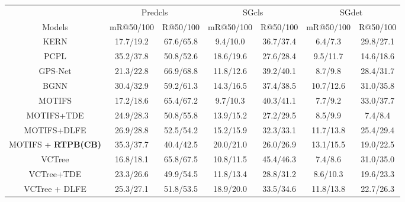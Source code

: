 \begin{table}[!ht]
	\centering
	\small
	\begin{tabular}{c|cc|cc|cc}
		\hline
		& \multicolumn{2}{c|}{Predcls} & \multicolumn{2}{c|}{SGcls} & \multicolumn{2}{c}{SGdet} \\
		Models                         & mR@50/100     & R@50/100     & mR@50/100    & R@50/100    & mR@50/100    & R@50/100    \\ \hline
		KERN\ddag\cite{chen2019knowledge}                      & 17.7/19.2     & 67.6/65.8    & 9.4/10.0     & 36.7/37.4   & 6.4/7.3      & 29.8/27.1   \\
		PCPL\ddag\cite{yan2020pcpl}                      & 35.2/37.8     & 50.8/52.6    & 18.6/19.6    & 27.6/28.4   & 9.5/11.7     & 14.6/18.6   \\
		GPS-Net\ddag\cite{lin2020gps}                        & 21.3/22.8   & 66.9/68.8    & 11.8/12.6      & 39.2/40.1   &8.7/9.8      & 28.4/31.7   \\
		BGNN\cite{li2021bipartite}                           & 30.4/32.9     & 59.2/61.3    & 14.3/16.5    & 37.4/38.5   & 10.7/12.6    & 31.0/35.8   \\ \hline
		MOTIFS\dag\cite{Zellers_2018_CVPR}                    & 17.2/18.6     & 65.4/67.2    & 9.7/10.3     & 40.3/41.1   & 7.7/9.2      & 33.0/37.7   \\
		MOTIFS+TDE\cite{Tang2020_unbiased}                        & 24.9/28.3     & 50.8/55.8    & 13.9/15.2    & 27.2/29.5   & 8.5/9.9    & 7.4/8.4  \\
		MOTIFS+DLFE\cite{chiou2021recovering}                    & 26.9/28.8     & 52.5/54.2    & 15.2/15.9    & 32.3/33.1   & 11.7/13.8    & 25.4/29.4   \\
		MOTIFS + \textbf{RTPB(CB)}               & 35.3/37.7     & 40.4/42.5    & 20.0/21.0    & 26.0/26.9   & 13.1/15.5    & 19.0/22.5   \\ \hline
		VCTree\dag\cite{VCTree_tang}                    & 16.8/18.1     & 65.8/67.5    & 10.8/11.5    & 45.4/46.3   & 7.4/8.6      & 31.0/35.0   \\
		VCTree+TDE\cite{Tang2020_unbiased}                        & 23.3/26.6     & 49.9/54.5    & 11.8/13.4 & 28.8/31.2   & 8.6/10.3    & 19.6/23.3  \\
		VCTree + DLFE\cite{chiou2021recovering}                  & 25.3/27.1     & 51.8/53.5    & 18.9/20.0    & 33.5/34.6   & 11.8/13.8    & 22.7/26.3   \\

\end{tabular}
\end{table}
